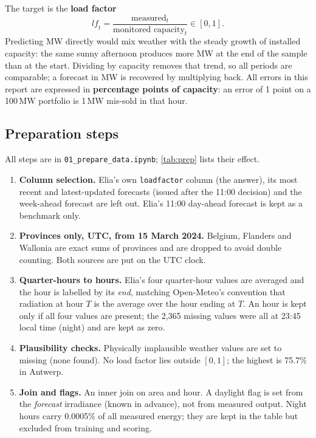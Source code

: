 \documentclass[11pt,a4paper]{article}
\newcommand{\lf}{\ensuremath{\mathit{lf}}}
\begin{document}
The target is the \textbf{load factor}
\[
  \lf_t = \frac{\text{measured}_t}{\text{monitored capacity}_t} \in [0,1].
\]
Predicting MW directly would mix weather with the steady growth of installed capacity: the same
sunny afternoon produces more MW at the end of the sample than at the start. Dividing by capacity
removes that trend, so all periods are comparable; a forecast in MW is recovered by multiplying back.
All errors in this report are expressed in \textbf{percentage points of capacity}: an error of 1
point on a 100\,MW portfolio is 1\,MW mis-sold in that hour.

\subsection{Preparation steps}

All steps are in \texttt{01\_prepare\_data.ipynb}; \cref{tab:prep} lists their effect.
\begin{enumerate}
  \item \textbf{Column selection.} Elia's own \texttt{loadfactor} column (the answer), its most recent
  and latest-updated forecasts (issued after the 11:00 decision) and the week-ahead forecast are
  left out. Elia's 11:00 day-ahead forecast is kept as a benchmark only.
  \item \textbf{Provinces only, UTC, from 15 March 2024.} Belgium, Flanders and Wallonia are exact
  sums of provinces and are dropped to avoid double counting. Both sources are put on the UTC clock.
  \item \textbf{Quarter-hours to hours.} Elia's four quarter-hour values are averaged and the hour is
  labelled by its \emph{end}, matching Open-Meteo's convention that radiation at hour $T$ is the
  average over the hour ending at $T$. An hour is kept only if all four values are present; the
  2,365 missing values were all at 23:45 local time (night) and are kept as zero.
  \item \textbf{Plausibility checks.} Physically implausible weather values are set to missing
  (none found). No load factor lies outside $[0,1]$; the highest is 75.7\% in Antwerp.
  \item \textbf{Join and flags.} An inner join on area and hour. A daylight flag is set from the
  \emph{forecast} irradiance (known in advance), not from measured output. Night hours carry
  0.0005\% of all measured energy; they are kept in the table but excluded from training and scoring.
\end{enumerate}
\end{document}
